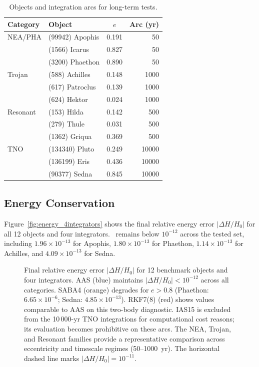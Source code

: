 \begin{table}
\centering
\caption{Objects and integration arcs for long-term tests.
\label{tab:lt_objects}}
\begin{tabular}{llcr}
\toprule
Category & Object & $e$ & Arc (yr) \\
\midrule
NEA/PHA   & (99942) Apophis   & 0.191 &    50 \\
          & (1566)  Icarus    & 0.827 &    50 \\
          & (3200)  Phaethon  & 0.890 &    50 \\
Trojan    & (588)   Achilles  & 0.148 &  1000 \\
          & (617)   Patroclus & 0.139 &  1000 \\
          & (624)   Hektor    & 0.024 &  1000 \\
Resonant  & (153)   Hilda     & 0.142 &   500 \\
          & (279)   Thule     & 0.031 &   500 \\
          & (1362)  Griqua    & 0.369 &   500 \\
TNO       & (134340) Pluto    & 0.249 & 10000 \\
          & (136199) Eris     & 0.436 & 10000 \\
          & (90377)  Sedna    & 0.845 & 10000 \\
\bottomrule
\end{tabular}
\end{table}

\subsection{Energy Conservation}
\label{sec:lt_energy}

Figure~\ref{fig:energy_4integrators} shows the final relative energy
error $|\Delta H/H_0|$ for all 12 objects and four
integrators. \AAS\ remains below $10^{-12}$ across the
tested set, including $1.96\times10^{-13}$ for Apophis,
$1.80\times10^{-13}$ for Phaethon, $1.14\times10^{-13}$
for Achilles, and $4.09\times10^{-13}$ for Sedna.

\begin{figure}
\caption{
  Final relative energy error $|\Delta H/H_0|$
  for 12 benchmark objects and four integrators.
  AAS (blue) maintains $|\Delta H/H_0| < 10^{-12}$
  across all categories. SABA4 (orange) degrades for
  $e > 0.8$ (Phaethon: $6.65\times10^{-6}$; Sedna:
  $4.85\times10^{-13}$). RKF7(8) (red) shows values
  comparable to AAS on this two-body diagnostic.
  IAS15 is excluded from the 10\,000-yr TNO
  integrations for computational cost reasons;
  its evaluation becomes prohibitive on these arcs.
  The NEA, Trojan, and Resonant families provide a
  representative comparison across eccentricity and
  timescale regimes (50--1000~yr).
  The horizontal dashed line marks $|\Delta H/H_0| = 10^{-11}$.
  \label{fig:energy_4integrators}
  \label{fig:energy}
}
\end{figure}

